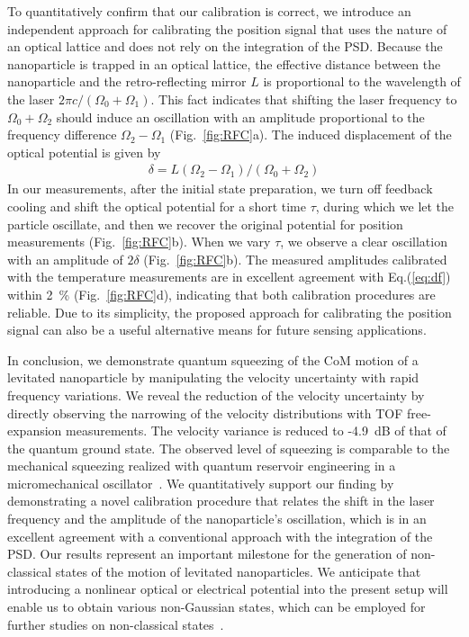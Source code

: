 \documentclass[aps, prl, 
amsmath, showpacs, preprintnumbers, twocolumn, amssymb, amsmath, superscriptaddress]{revtex4-1}
\begin{document}
To quantitatively confirm that our calibration is correct, we introduce an independent approach for calibrating the position signal that uses the nature of an optical lattice and does not rely on the integration of the PSD. Because the nanoparticle is trapped in an optical lattice, the effective distance between the nanoparticle and the retro-reflecting mirror $L$ is proportional to the wavelength of the laser $2\pi c/(\Omega_0+\Omega_1)$. This fact indicates that shifting the laser frequency to $\Omega_0+\Omega_2$ should induce an oscillation with an amplitude proportional to the frequency difference $\Omega_2 - \Omega_1$ (Fig.~\ref{fig:RFC}a). The induced displacement of the optical potential is given by 
\begin{eqnarray}
\delta = L ( \Omega_2 - \Omega_1) /(\Omega_0 + \Omega_2) 
\label{eq:df}
\end{eqnarray} 
In our measurements, after the initial state preparation, we turn off feedback cooling and  shift the optical potential for a short time $\tau$, during which we let the particle oscillate, and then we recover the original potential for position measurements (Fig.~\ref{fig:RFC}b). When we vary $\tau$, we observe a clear oscillation with an amplitude of $2\delta$ (Fig.~\ref{fig:RFC}b). The measured amplitudes calibrated with the temperature measurements are in excellent agreement with Eq.(\ref{eq:df}) within 2~\% (Fig.~\ref{fig:RFC}d), indicating that both calibration procedures are reliable. Due to its simplicity, the proposed approach for calibrating the position signal can also be a useful alternative means for future sensing applications.


In conclusion, we demonstrate quantum squeezing of the CoM motion of a levitated nanoparticle by manipulating the velocity uncertainty with rapid frequency variations. We reveal the reduction of the velocity uncertainty by directly observing the narrowing of the velocity distributions with TOF free-expansion measurements. The velocity variance is reduced to -4.9~dB of that of the quantum ground state. The observed level of squeezing is comparable to the mechanical squeezing realized with quantum reservoir engineering in a micromechanical oscillator~\cite{lei2016quantum}. We quantitatively support our finding by demonstrating a novel calibration procedure that relates the shift in the laser frequency and the amplitude of the nanoparticle's oscillation, which is in an excellent agreement with a conventional approach with the integration of the PSD. Our results represent an important milestone for the generation of non-classical states of the motion of levitated nanoparticles. We anticipate that introducing a nonlinear optical or electrical potential into the present setup will enable us to obtain various non-Gaussian states, which can be employed for further studies on non-classical states~\cite{neumeier2024fast}. 
\end{document}
